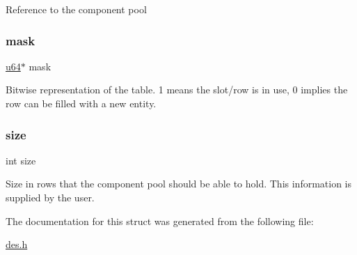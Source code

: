 Reference to the component pool \mbox{\label{struct_meta_component_pool_a43d2252901e2a4aa70563cfb707b6fa7}} 
\subsubsection{\texorpdfstring{mask}{mask}}
{\footnotesize\ttfamily \mbox{\hyperlink{des__internal_8h_a3f7e2bcbb0b4c338f3c4f6c937cd4234}{u64}}$\ast$ mask}

Bitwise representation of the table. 1 means the slot/row is in use, 0 implies the row can be filled with a new entity. \mbox{\label{struct_meta_component_pool_a439227feff9d7f55384e8780cfc2eb82}} 
\subsubsection{\texorpdfstring{size}{size}}
{\footnotesize\ttfamily int size}

Size in rows that the component pool should be able to hold. This information is supplied by the user. 

The documentation for this struct was generated from the following file\+:\begin{DoxyCompactItemize}
\item 
\mbox{\hyperlink{des_8h}{des.\+h}}\end{DoxyCompactItemize}
